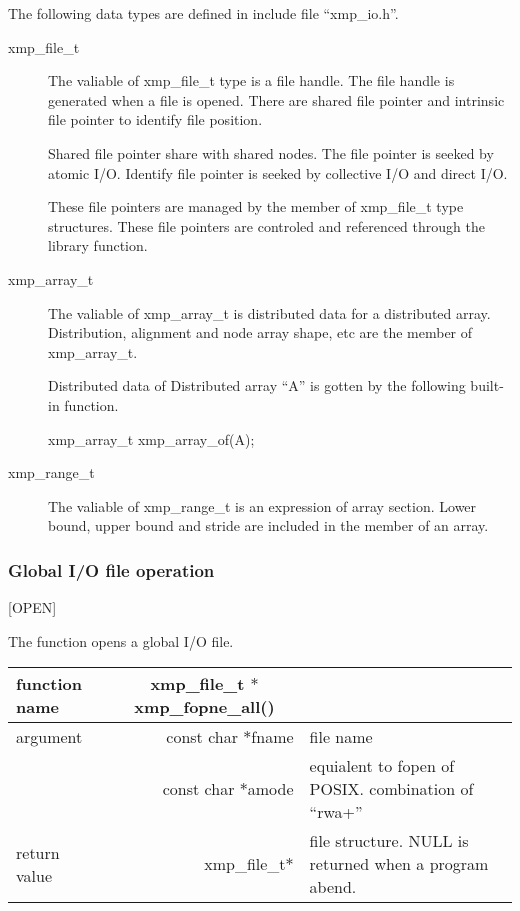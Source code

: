    The following data types are defined in include file ``xmp\_io.h''.
   \begin{description}
    \item[xmp\_file\_t] The valiable of xmp\_file\_t type is a file
	       handle.
	       The file handle is generated when a file is opened.
	       There are shared file pointer and intrinsic file pointer
	       to identify file position.

	       Shared file pointer share with shared nodes.
	       The file pointer is seeked by atomic I/O.
	       Identify file pointer is seeked by collective I/O and
	       direct I/O.
	       
	       These file pointers are managed by the member of
	       xmp\_file\_t type structures.
	       These file pointers are controled and referenced through
	       the library function.
	       
    \item[xmp\_array\_t] The valiable of xmp\_array\_t is distributed data
	       for a distributed array.
	       Distribution, alignment and node array shape, etc are the
	       member of xmp\_array\_t.

	       Distributed data of Distributed array ``A'' is gotten by
	       the following built-in function.
	       
	       xmp\_array\_t xmp\_array\_of(A);
	       
    \item[xmp\_range\_t] The valiable of xmp\_range\_t is an expression
	       of array section.
	       Lower bound, upper bound and stride are included in the
	       member of an array.
   \end{description}

   \subsubsection{Global I/O file operation}

   [OPEN]
   
   The function opens a global I/O file.
   \begin{table}[h]
    \begin{center}
     \begin{tabular}{l|r|p{70mm}}
      \hline
      {\bf function name}  & \multicolumn{1}{c}{\bf xmp\_file\_t
      $*$xmp\_fopne\_all()} &  \\ \hline
      argument & const char $*$fname & file name \\ \cline{2-3}
      & const char $*$amode & equialent to fopen of POSIX. combination
	      of ``rwa+'' \\ \hline
      return value & xmp\_file\_t$*$ & file structure. NULL is returned
	      when a program abend. \\ \hline
      \end{tabular}
     \end{center}
    \label{tb:aaa}
   \end{table}

